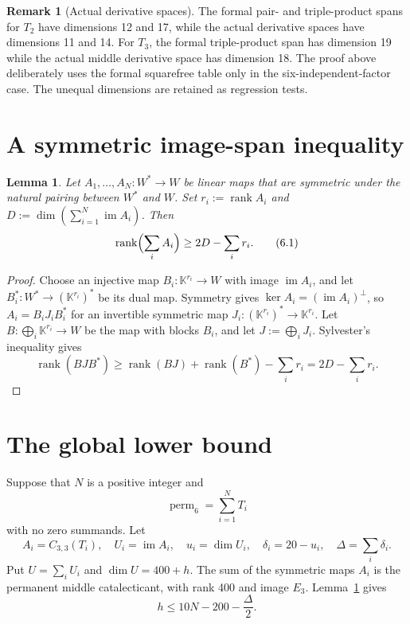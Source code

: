 \documentclass[11pt]{amsart}
\newcommand{\K}{\mathbb{K}}
\newcommand{\im}{\operatorname{im}}
\newcommand{\rank}{\operatorname{rank}}
\newcommand{\perm}{\operatorname{perm}}
\newtheorem{lemma}[theorem]{Lemma}
\theoremstyle{definition}
\newtheorem{remark}[theorem]{Remark}
\begin{document}
\begin{remark}[Actual derivative spaces]\label{rem:actual-spaces}
The formal pair- and triple-product spans for \(T_2\) have dimensions 12
and 17, while the actual derivative spaces have dimensions 11 and 14. For
\(T_3\), the formal triple-product span has dimension 19 while the actual
middle derivative space has dimension 18. The proof above deliberately uses
the formal squarefree table only in the six-independent-factor case. The
unequal dimensions are retained as regression tests.
\end{remark}

\section{A symmetric image-span inequality}

\begin{lemma}\label{lem:image-span}
Let \(A_1,\ldots,A_N:W^*\to W\) be linear maps that are symmetric under the
natural pairing between \(W^*\) and \(W\). Set \(r_i:=\rank A_i\) and
\(D:=\dim(\sum_{i=1}^N\im A_i)\). Then
\[
 \rank\Bigl(\sum_iA_i\Bigr)\ge2D-\sum_i r_i. \tag{6.1}
\]
\end{lemma}

\begin{proof}
Choose an injective map \(B_i:\K^{r_i}\to W\) with image \(\im A_i\), and
let \(B_i^*:W^*\to(\K^{r_i})^*\) be its dual map. Symmetry gives
\(\ker A_i=(\im A_i)^\perp\), so
\(A_i=B_iJ_iB_i^*\) for an invertible symmetric map
\(J_i:(\K^{r_i})^*\to\K^{r_i}\). Let
\(B:\bigoplus_i\K^{r_i}\to W\) be the map with blocks \(B_i\), and let
\(J:=\bigoplus_iJ_i\). Sylvester's inequality
gives
\[
 \rank(BJB^*)\ge\rank(BJ)+\rank(B^*)-\sum_i r_i
 =2D-\sum_i r_i.
\]
\end{proof}

\section{The global lower bound}\label{sec:global}

Suppose that \(N\) is a positive integer and
\[
 \perm_6=\sum_{i=1}^NT_i
\]
with no zero summands. Let
\[
 A_i=C_{3,3}(T_i),\quad U_i=\im A_i,\quad u_i=\dim U_i,
 \quad\delta_i=20-u_i,\quad\Delta=\sum_i\delta_i.
\]
Put \(U=\sum_iU_i\) and \(\dim U=400+h\). The sum of the symmetric maps
\(A_i\) is the permanent middle catalecticant, with rank 400 and image
\(E_3\). Lemma~\ref{lem:image-span} gives
\[
 \boxed{h\le10N-200-\frac\Delta2.} \tag{7.1}
\]
\end{document}
